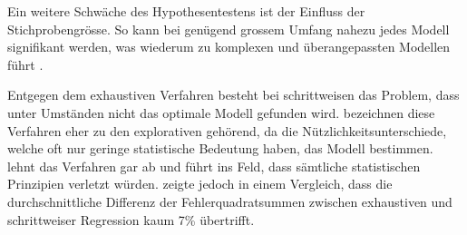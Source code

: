 Ein weitere Schwäche des Hypothesentestens ist der Einfluss der Stichprobengrösse. So kann bei genügend grossem Umfang nahezu jedes Modell  signifikant werden, was wiederum zu komplexen und überangepassten Modellen führt \cite[p.173]{weakliem2004introduction}.

Entgegen dem exhaustiven Verfahren besteht bei schrittweisen das Problem, dass unter Umständen nicht das optimale Modell gefunden wird. 
 bezeichnen diese Verfahren eher zu den explorativen gehörend, da die Nützlichkeitsunterschiede, welche oft nur geringe statistische Bedeutung haben, das Modell bestimmen.
 lehnt das Verfahren gar ab und führt ins Feld, dass sämtliche statistischen Prinzipien verletzt würden. 
 zeigte jedoch in einem Vergleich, dass die durchschnittliche Differenz der Fehlerquadratsummen zwischen exhaustiven und schrittweiser Regression kaum 7\% übertrifft. 